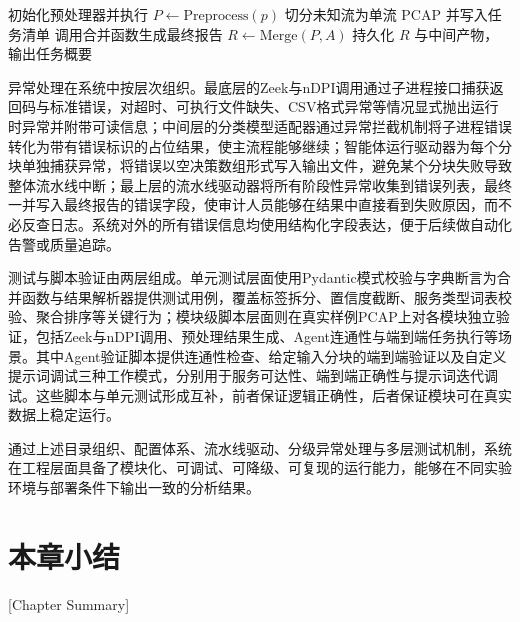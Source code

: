   \begin{algorithm}[h]
	\caption{端到端流水线执行流程}\label{alg:ch4-pipeline}

	初始化预处理器并执行 $P \gets \mathrm{Preprocess}(p)$\;
	切分未知流为单流 PCAP 并写入任务清单\;
	调用合并函数生成最终报告 $R \gets \mathrm{Merge}(P, A)$\;
	持久化 $R$ 与中间产物，输出任务概要\;
	\;
\end{algorithm}

异常处理在系统中按层次组织。最底层的Zeek与nDPI调用通过子进程接口捕获返回码与标准错误，对超时、可执行文件缺失、CSV格式异常等情况显式抛出运行时异常并附带可读信息；中间层的分类模型适配器通过异常拦截机制将子进程错误转化为带有错误标识的占位结果，使主流程能够继续；智能体运行驱动器为每个分块单独捕获异常，将错误以空决策数组形式写入输出文件，避免某个分块失败导致整体流水线中断；最上层的流水线驱动器将所有阶段性异常收集到错误列表，最终一并写入最终报告的错误字段，使审计人员能够在结果中直接看到失败原因，而不必反查日志。系统对外的所有错误信息均使用结构化字段表达，便于后续做自动化告警或质量追踪。

测试与脚本验证由两层组成。单元测试层面使用Pydantic模式校验与字典断言为合并函数与结果解析器提供测试用例，覆盖标签拆分、置信度截断、服务类型词表校验、聚合排序等关键行为；模块级脚本层面则在真实样例PCAP上对各模块独立验证，包括Zeek与nDPI调用、预处理结果生成、Agent连通性与端到端任务执行等场景。其中Agent验证脚本提供连通性检查、给定输入分块的端到端验证以及自定义提示词调试三种工作模式，分别用于服务可达性、端到端正确性与提示词迭代调试。这些脚本与单元测试形成互补，前者保证逻辑正确性，后者保证模块可在真实数据上稳定运行。

通过上述目录组织、配置体系、流水线驱动、分级异常处理与多层测试机制，系统在工程层面具备了模块化、可调试、可降级、可复现的运行能力，能够在不同实验环境与部署条件下输出一致的分析结果。

\section{本章小结}[Chapter Summary]

